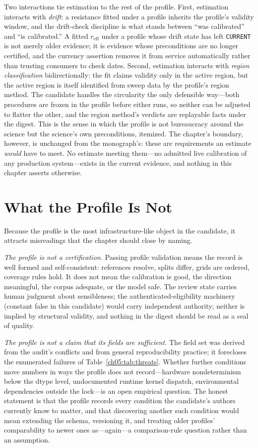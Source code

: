 Two interactions tie estimation to the rest of the profile. First, estimation interacts with \emph{drift}: a resistance
fitted under a profile inherits the profile's validity window, and the
drift-check discipline is what stands between ``was calibrated'' and ``is
calibrated.'' A fitted $r_{\mathrm{eff}}$ under a profile whose drift state
has left \texttt{CURRENT} is not merely older evidence; it is evidence
whose preconditions are no longer certified, and the currency assertion
removes it from service automatically rather than trusting consumers to
check dates. Second, estimation interacts with \emph{region
classification} bidirectionally: the fit claims validity only in the
active region, but the active region is itself identified from sweep data
by the profile's region method. The candidate handles the circularity the
only defensible way---both procedures are frozen in the profile before
either runs, so neither can be adjusted to flatter the other, and the
region method's verdicts are replayable facts under the digest. This is the sense in which the profile is not bureaucracy
around the science but the science's own preconditions, itemized. The
chapter's boundary, however, is unchanged from the monograph's: these are
requirements an estimate \emph{would} have to meet. No estimate meeting
them---no admitted live calibration of any production system---exists in the
current evidence, and nothing in this chapter asserts otherwise.

\section{What the Profile Is Not}\label{ch05:isnot}

Because the profile is the most infrastructure-like object in the
candidate, it attracts misreadings that the chapter should close by naming.

\emph{The profile is not a certification.} Passing profile validation means
the record is well formed and self-consistent: references resolve, splits
differ, grids are ordered, coverage rules hold. It does not mean the
calibration is good, the direction meaningful, the corpus adequate, or the
model safe. The review state carries human judgment about sensibleness;
the authenticated-eligibility machinery (constant false in this candidate)
would carry independent authority; neither is implied by structural
validity, and nothing in the digest should be read as a seal of quality.

\emph{The profile is not a claim that its fields are sufficient.} The field
set was derived from the audit's conflicts and from general reproducibility
practice; it forecloses the enumerated failures of
Table~\ref{ch05:tab:threats}. Whether further conditions move numbers in
ways the profile does not record---hardware nondeterminism below the dtype
level, undocumented runtime kernel dispatch, environmental dependencies
outside the lock---is an open empirical question. The honest statement is
that the profile records every condition the candidate's authors currently
know to matter, and that discovering another such condition would mean
extending the schema, versioning it, and treating older profiles'
comparability to newer ones as---again---a comparison-rule question rather
than an assumption.

